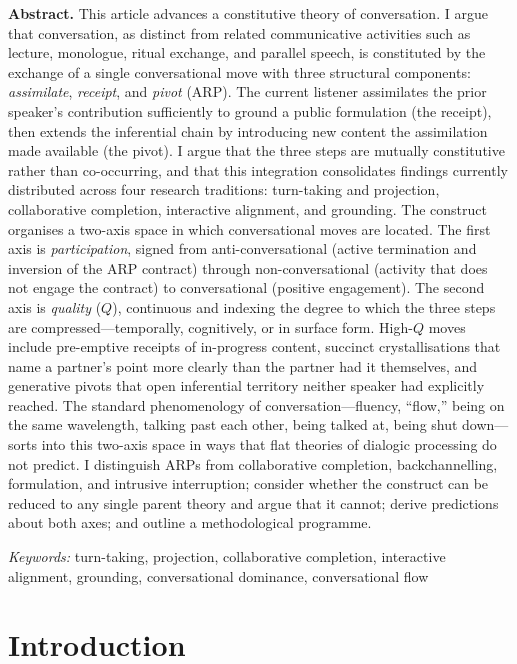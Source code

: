 \noindent\textbf{Abstract.} This article advances a constitutive theory of conversation. I argue that conversation, as distinct from related communicative activities such as lecture, monologue, ritual exchange, and parallel speech, is constituted by the exchange of a single conversational move with three structural components: \emph{assimilate}, \emph{receipt}, and \emph{pivot} (ARP). The current listener assimilates the prior speaker's contribution sufficiently to ground a public formulation (the receipt), then extends the inferential chain by introducing new content the assimilation made available (the pivot). I argue that the three steps are mutually constitutive rather than co-occurring, and that this integration consolidates findings currently distributed across four research traditions: turn-taking and projection, collaborative completion, interactive alignment, and grounding. The construct organises a two-axis space in which conversational moves are located. The first axis is \emph{participation}, signed from anti-conversational (active termination and inversion of the ARP contract) through non-conversational (activity that does not engage the contract) to conversational (positive engagement). The second axis is \emph{quality} ($Q$), continuous and indexing the degree to which the three steps are compressed---temporally, cognitively, or in surface form. High-$Q$ moves include pre-emptive receipts of in-progress content, succinct crystallisations that name a partner's point more clearly than the partner had it themselves, and generative pivots that open inferential territory neither speaker had explicitly reached. The standard phenomenology of conversation---fluency, ``flow,'' being on the same wavelength, talking past each other, being talked at, being shut down---sorts into this two-axis space in ways that flat theories of dialogic processing do not predict. I distinguish ARPs from collaborative completion, backchannelling, formulation, and intrusive interruption; consider whether the construct can be reduced to any single parent theory and argue that it cannot; derive predictions about both axes; and outline a methodological programme.

\medskip
\noindent\textit{Keywords:} turn-taking, projection, collaborative completion, interactive alignment, grounding, conversational dominance, conversational flow


\section{Introduction}


